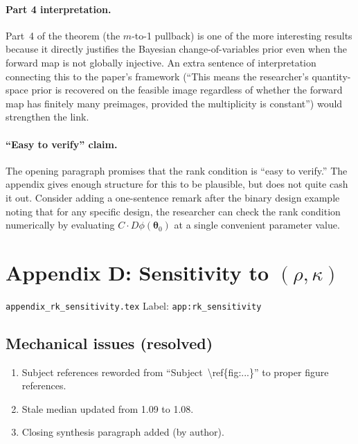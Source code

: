 \documentclass[11pt,a4paper]{article}
\begin{document}
\paragraph{Part 4 interpretation.}
Part~4 of the theorem (the $m$-to-1 pullback) is one of the more
interesting results because it directly justifies the Bayesian
change-of-variables prior even when the forward map is not globally
injective. An extra sentence of interpretation connecting this to the
paper's framework (``This means the researcher's quantity-space prior is
recovered on the feasible image regardless of whether the forward map
has finitely many preimages, provided the multiplicity is constant'')
would strengthen the link.

\paragraph{``Easy to verify'' claim.}
The opening paragraph promises that the rank condition is ``easy to
verify.'' The appendix gives enough structure for this to be plausible,
but does not quite cash it out. Consider adding a one-sentence remark
after the binary design example noting that for any specific design, the
researcher can check the rank condition numerically by evaluating $C
\cdot D\phi(\bm{\theta}_0)$ at a single convenient parameter value.


\section{Appendix D: Sensitivity to $(\rho, \kappa)$}

\texttt{appendix\_rk\_sensitivity.tex} \hfill Label:
\texttt{app:rk\_sensitivity}

\subsection{Mechanical issues (resolved)}

\begin{enumerate}[label=\arabic*.]
  \item Subject references reworded from
    ``Subject~\textbackslash ref\{fig:...\}'' to proper figure references.
  \item Stale median updated from 1.09 to 1.08.
  \item Closing synthesis paragraph added (by author).
\end{enumerate}
\end{document}
